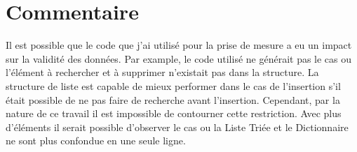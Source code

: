 \documentclass[11pt, french]{article} %
\begin{document}
\section{Commentaire}
Il est possible que le code que j'ai utilisé pour la prise de mesure a eu un impact sur la validité des données. Par example, le code utilisé ne générait pas le cas ou l'élément à rechercher et à supprimer n'existait pas dans la structure. La structure de liste est capable de mieux performer dans le cas de l'insertion s'il était possible de ne pas faire de recherche avant l'insertion. Cependant, par la nature de ce travail il est impossible de contourner cette restriction. Avec plus d'éléments il serait possible d'observer le cas ou la Liste Triée et le Dictionnaire ne sont plus confondue en une seule ligne.
\newline
\end{document}
